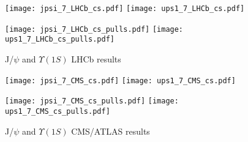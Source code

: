 \documentclass{article}
\begin{document}
\clearpage

\begin{figure}
\centering
\texttt{[image: jpsi\_7\_LHCb\_cs.pdf]}
\texttt{[image: ups1\_7\_LHCb\_cs.pdf]}

\texttt{[image: jpsi\_7\_LHCb\_cs\_pulls.pdf]}
\texttt{[image: ups1\_7\_LHCb\_cs\_pulls.pdf]}
\caption{J/$\psi$ and $\Upsilon(1S)$ LHCb results}
\end{figure}

\clearpage

\begin{figure}
\centering
\texttt{[image: jpsi\_7\_CMS\_cs.pdf]}
\texttt{[image: ups1\_7\_CMS\_cs.pdf]}

\texttt{[image: jpsi\_7\_CMS\_cs\_pulls.pdf]}
\texttt{[image: ups1\_7\_CMS\_cs\_pulls.pdf]}
\caption{J/$\psi$ and $\Upsilon(1S)$ CMS/ATLAS results}
\end{figure}

\clearpage


\end{document}
